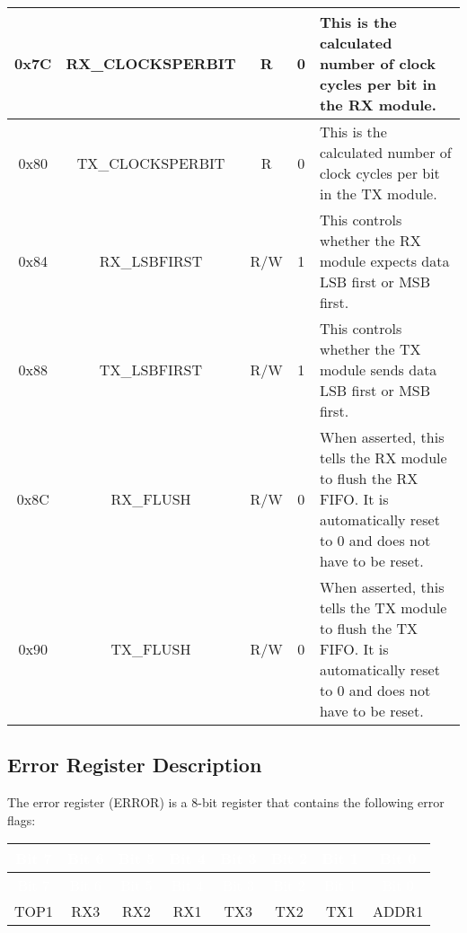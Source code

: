 \begin{longtable}{|c|c|c|c|p{}|}
    0x7C &
    RX\_CLOCKSPERBIT &
    R &
    0 &
    This is the calculated number of clock cycles per bit in the RX module.
    \\ \hline

    0x80 &
    TX\_CLOCKSPERBIT &
    R &
    0 &
    This is the calculated number of clock cycles per bit in the TX module.
    \\ \hline

    0x84 &
    RX\_LSBFIRST &
    R/W &
    1 &
    This controls whether the RX module expects data LSB first or MSB first.
    \\ \hline

    0x88 &
    TX\_LSBFIRST &
    R/W &
    1 &
    This controls whether the TX module sends data LSB first or MSB first.
    \\ \hline

    0x8C &
    RX\_FLUSH &
    R/W &
    0 &
    When asserted, this tells the RX module to flush the RX FIFO. It is automatically reset to 0 and does not have to be reset.
    \\ \hline

    0x90 &
    TX\_FLUSH &
    R/W &
    0 &
    When asserted, this tells the TX module to flush the TX FIFO. It is automatically reset to 0 and does not have to be reset.
    \\ \hline
\end{longtable}
\label{table:uart_register_map}
\endgroup

\subsection{Error Register Description}

The error register (ERROR) is a 8-bit register that contains the following error flags:
\renewcommand*{\arraystretch}{1.25}
\begingroup
\small
{}
\begin{longtable}{|c|c|c|c|c|c|c|c|}
    \hline
    \rowcolor{gray}
    \textcolor{white}{Bit 7} & \textcolor{white}{Bit 6} & \textcolor{white}{Bit 5} & \textcolor{white}{Bit 4} & \textcolor{white}{Bit 3} & \textcolor{white}{Bit 2} & \textcolor{white}{Bit 1} & \textcolor{white}{Bit 0} \\ \hline
    \endfirsthead

    \hline
    \rowcolor{gray}
    \textcolor{white}{Bit 7} & \textcolor{white}{Bit 6} & \textcolor{white}{Bit 5} & \textcolor{white}{Bit 4} & \textcolor{white}{Bit 3} & \textcolor{white}{Bit 2} & \textcolor{white}{Bit 1} & \textcolor{white}{Bit 0} \\ \hline
    \endhead

    \hline
    \endfoot

    TOP1 & RX3 & RX2 & RX1 & TX3 & TX2 & TX1 & ADDR1 \\ \hline
\end{longtable}
\label{table:uart_error}
\endgroup

